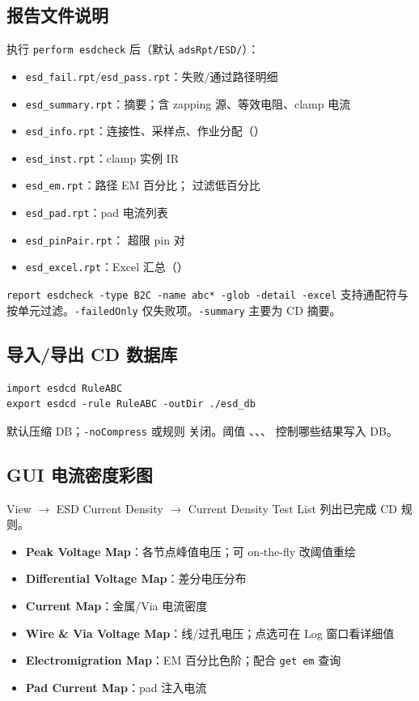\subsection{报告文件说明}
执行 \texttt{perform esdcheck} 后（默认 \texttt{adsRpt/ESD/}）：
\begin{itemize}
  \item \texttt{esd\_fail.rpt}/\texttt{esd\_pass.rpt}：失败/通过路径明细
  \item \texttt{esd\_summary.rpt}：摘要；含 zapping 源、等效电阻、clamp 电流
  \item \texttt{esd\_info.rpt}：连接性、采样点、作业分配（）
  \item \texttt{esd\_inst.rpt}：clamp 实例 IR
  \item \texttt{esd\_em.rpt}：路径 EM 百分比； 过滤低百分比
  \item \texttt{esd\_pad.rpt}：pad 电流列表
  \item \texttt{esd\_pinPair.rpt}： 超限 pin 对
  \item \texttt{esd\_excel.rpt}：Excel 汇总（）
\end{itemize}

\texttt{report esdcheck -type B2C -name abc* -glob -detail -excel} 支持通配符与按单元过滤。\texttt{-failedOnly} 仅失败项。\texttt{-summary} 主要为 CD 摘要。

\subsection{导入/导出 CD 数据库}
\begin{lstlisting}
import esdcd RuleABC
export esdcd -rule RuleABC -outDir ./esd_db
\end{lstlisting}
默认压缩 DB；\texttt{-noCompress} 或规则  关闭。阈值 、、、 控制哪些结果写入 DB。

\subsection{GUI 电流密度彩图}
View $\rightarrow$ ESD Current Density $\rightarrow$ Current Density Test List 列出已完成 CD 规则。

\begin{itemize}
  \item \textbf{Peak Voltage Map}：各节点峰值电压；可 on-the-fly 改阈值重绘
  \item \textbf{Differential Voltage Map}：差分电压分布
  \item \textbf{Current Map}：金属/Via 电流密度
  \item \textbf{Wire \& Via Voltage Map}：线/过孔电压；点选可在 Log 窗口看详细值
  \item \textbf{Electromigration Map}：EM 百分比色阶；配合 \texttt{get em} 查询
  \item \textbf{Pad Current Map}：pad 注入电流
\end{itemize}

